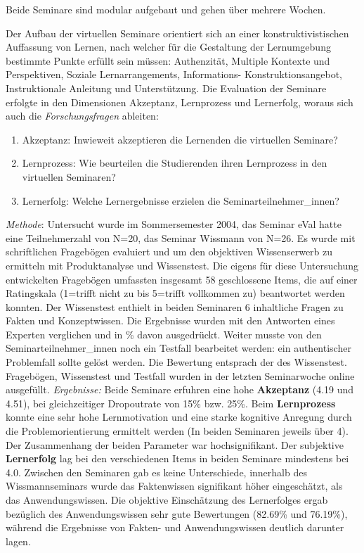 \documentclass[12pt, bibliography=totoc]{scrartcl}
\begin{document}
Beide Seminare sind modular aufgebaut und gehen über mehrere Wochen.

Der Aufbau der virtuellen Seminare orientiert sich an einer
konstruktivistischen Auffassung von Lernen, nach welcher für die
Gestaltung der Lernumgebung bestimmte Punkte erfüllt sein müssen:
Authenzität, Multiple Kontexte und Perspektiven, Soziale
Lernarrangements, Informations- Konstruktionsangebot, Instruktionale
Anleitung und Unterstützung. Die Evaluation der Seminare erfolgte in den
Dimensionen Akzeptanz, Lernprozess und Lernerfolg, woraus sich auch die
\emph{Forschungsfragen} ableiten:

\begin{enumerate}
\def\labelenumi{\arabic{enumi}.}
\itemsep1pt\parskip0pt
\item
  Akzeptanz: Inwieweit akzeptieren die Lernenden die virtuellen
  Seminare?
\item
  Lernprozess: Wie beurteilen die Studierenden ihren Lernprozess in den
  virtuellen Seminaren?
\item
  Lernerfolg: Welche Lernergebnisse erzielen die
  Seminarteilnehmer\_innen?
\end{enumerate}

\emph{Methode}: Untersucht wurde im Sommersemester 2004, das Seminar
eVal hatte eine Teilnehmerzahl von N=20, das Seminar Wissmann von N=26.
Es wurde mit schriftlichen Fragebögen evaluiert und um den objektiven
Wissenserwerb zu ermitteln mit Produktanalyse und Wissenstest. Die
eigens für diese Untersuchung entwickelten Fragebögen umfassten
insgesamt 58 geschlossene Items, die auf einer Ratingskala (1=trifft
nicht zu bis 5=trifft vollkommen zu) beantwortet werden konnten. Der
Wissenstest enthielt in beiden Seminaren 6 inhaltliche Fragen zu Fakten
und Konzeptwissen. Die Ergebnisse wurden mit den Antworten eines
Experten verglichen und in \% davon ausgedrückt. Weiter musste von den
Seminarteilnehmer\_innen noch ein Testfall bearbeitet werden: ein
authentischer Problemfall sollte gelöst werden. Die Bewertung entsprach
der des Wissenstest. Fragebögen, Wissenstest und Testfall wurden in der
letzten Seminarwoche online ausgefüllt. \emph{Ergebnisse:} Beide
Seminare erfuhren eine hohe \textbf{Akzeptanz} (4.19 und 4.51), bei
gleichzeitiger Dropoutrate von 15\% bzw. 25\%. Beim \textbf{Lernprozess}
konnte eine sehr hohe Lernmotivation und eine starke kognitive Anregung
durch die Problemorientierung ermittelt werden (In beiden Seminaren
jeweils über 4). Der Zusammenhang der beiden Parameter war
hochsignifikant. Der subjektive \textbf{Lernerfolg} lag bei den
verschiedenen Items in beiden Seminare mindestens bei 4.0. Zwischen den
Seminaren gab es keine Unterschiede, innerhalb des Wissmannseminars
wurde das Faktenwissen signifikant höher eingeschätzt, als das
Anwendungswissen. Die objektive Einschätzung des Lernerfolges ergab
bezüglich des Anwendungswissen sehr gute Bewertungen (82.69\% und
76.19\%), während die Ergebnisse von Fakten- und Anwendungswissen
deutlich darunter lagen.
\end{document}
